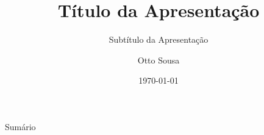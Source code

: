 \documentclass{libs/ufc_format}
\title[short title]{\huge\textbf{Título da Apresentação}}
\subtitle{Subtítulo da Apresentação}
\author{Otto Sousa}
\institute[UFC]{
    \normalsize{\email{ottolopes20@gmail.com}}
    \newline
    \department{Departamento de Engenharia de Teleinformática}
    \newline
    \ufc
}
\date{\today}
\begin{document}


\begin{frame}{}
    \maketitle
\end{frame}

\begin{frame}{Sumário}
    \begin{multicols}{2}
        \tableofcontents
    \end{multicols}
\end{frame}














\end{document}
